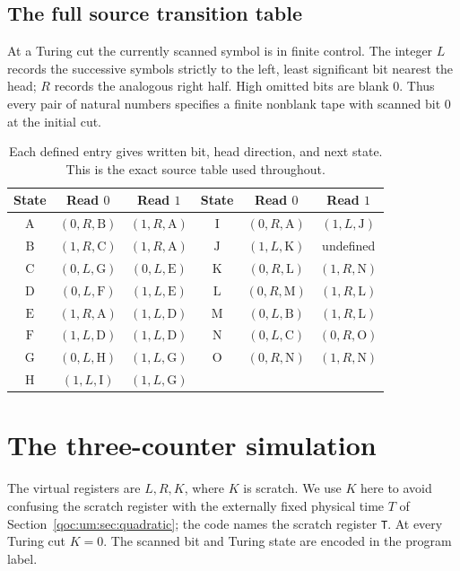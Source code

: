 \documentclass[11pt,letterpaper]{article}
\theoremstyle{definition}
\theoremstyle{remark}
\newcommand{\file}[1]{\nolinkurl{#1}}
\begin{document}
\subsection{The full source transition table}
At a Turing cut the currently scanned symbol is in finite control. The integer $L$ records the successive symbols strictly to the left, least significant bit nearest the head; $R$ records the analogous right half. High omitted bits are blank $0$. Thus every pair of natural numbers specifies a finite nonblank tape with scanned bit $0$ at the initial cut.

\begin{table}[ht]
\centering
\begin{tabular}{ccc@{\qquad}ccc}
\toprule
State & Read $0$ & Read $1$ & State & Read $0$ & Read $1$\\\midrule
$\mathrm A$ & $(0,R,\mathrm B)$ & $(1,R,\mathrm A)$ & $\mathrm I$ & $(0,R,\mathrm A)$ & $(1,L,\mathrm J)$\\
$\mathrm B$ & $(1,R,\mathrm C)$ & $(1,R,\mathrm A)$ & $\mathrm J$ & $(1,L,\mathrm K)$ & undefined\\
$\mathrm C$ & $(0,L,\mathrm G)$ & $(0,L,\mathrm E)$ & $\mathrm K$ & $(0,R,\mathrm L)$ & $(1,R,\mathrm N)$\\
$\mathrm D$ & $(0,L,\mathrm F)$ & $(1,L,\mathrm E)$ & $\mathrm L$ & $(0,R,\mathrm M)$ & $(1,R,\mathrm L)$\\
$\mathrm E$ & $(1,R,\mathrm A)$ & $(1,L,\mathrm D)$ & $\mathrm M$ & $(0,L,\mathrm B)$ & $(1,R,\mathrm L)$\\
$\mathrm F$ & $(1,L,\mathrm D)$ & $(1,L,\mathrm D)$ & $\mathrm N$ & $(0,L,\mathrm C)$ & $(0,R,\mathrm O)$\\
$\mathrm G$ & $(0,L,\mathrm H)$ & $(1,L,\mathrm G)$ & $\mathrm O$ & $(0,R,\mathrm N)$ & $(1,R,\mathrm N)$\\
$\mathrm H$ & $(1,L,\mathrm I)$ & $(1,L,\mathrm G)$ & & &\\\bottomrule
\end{tabular}
\caption{Each defined entry gives written bit, head direction, and next state. This is the exact source table used throughout.}\label{qoc:um:tab:tm}
\end{table}

\section{The three-counter simulation}\label{qoc:um:sec:virtual}
The virtual registers are $L,R,K$, where $K$ is scratch. We use $K$ here to avoid confusing the scratch register with the externally fixed physical time $T$ of Section~\ref{qoc:um:sec:quadratic}; the code names the scratch register \file{T}. At every Turing cut $K=0$. The scanned bit and Turing state are encoded in the program label.
\end{document}
